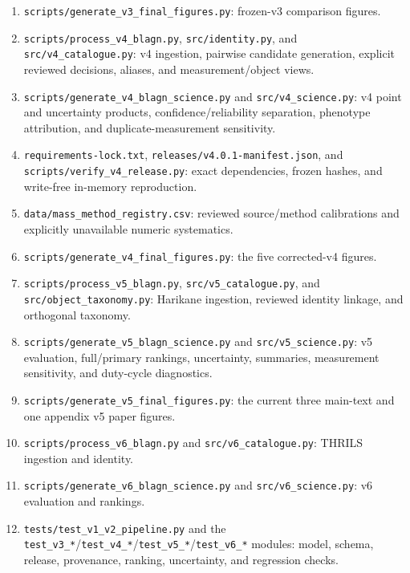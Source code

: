 \documentclass[11pt]{article}
\newcommand{\repo}[1]{{\footnotesize\texttt{#1}}}
\begin{document}
\begin{enumerate}
  \item \repo{scripts/generate\_v3\_final\_figures.py}: frozen-v3 comparison figures.\par
  \item \repo{scripts/process\_v4\_blagn.py}, \repo{src/identity.py}, and \repo{src/v4\_catalogue.py}: v4 ingestion, pairwise candidate generation, explicit reviewed decisions, aliases, and measurement/object views.\par
  \item \repo{scripts/generate\_v4\_blagn\_science.py} and \repo{src/v4\_science.py}: v4 point and uncertainty products, confidence/reliability separation, phenotype attribution, and duplicate-measurement sensitivity.\par
  \item \repo{requirements-lock.txt}, \repo{releases/v4.0.1-manifest.json}, and \repo{scripts/verify\_v4\_release.py}: exact dependencies, frozen hashes, and write-free in-memory reproduction.\par
  \item \repo{data/mass\_method\_registry.csv}: reviewed source/method calibrations and explicitly unavailable numeric systematics.\par
  \item \repo{scripts/generate\_v4\_final\_figures.py}: the five corrected-v4 figures.\par
  \item \repo{scripts/process\_v5\_blagn.py}, \repo{src/v5\_catalogue.py}, and \repo{src/object\_taxonomy.py}: Harikane ingestion, reviewed identity linkage, and orthogonal taxonomy.\par
  \item \repo{scripts/generate\_v5\_blagn\_science.py} and \repo{src/v5\_science.py}: v5 evaluation, full/primary rankings, uncertainty, summaries, measurement sensitivity, and duty-cycle diagnostics.\par
  \item \repo{scripts/generate\_v5\_final\_figures.py}: the current three main-text and one appendix v5 paper figures.\par
  \item \repo{scripts/process\_v6\_blagn.py} and \repo{src/v6\_catalogue.py}: THRILS ingestion and identity.\par
  \item \repo{scripts/generate\_v6\_blagn\_science.py} and \repo{src/v6\_science.py}: v6 evaluation and rankings.\par
  \item \repo{tests/test\_v1\_v2\_pipeline.py} and the \repo{test\_v3\_*}/\repo{test\_v4\_*}/\repo{test\_v5\_*}/\repo{test\_v6\_*} modules: model, schema, release, provenance, ranking, uncertainty, and regression checks.\par
\end{enumerate}
\end{document}
